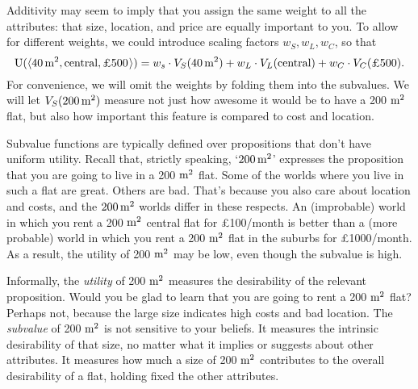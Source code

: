 Additivity may seem to imply that you assign the same weight to all the
attributes: that size, location, and price are equally important to you. To
allow for different weights, we could introduce scaling factors $w_S, w_L, w_C$,
so that
\[
\U(\t{40\, \m^2, \text{central}, \text{£500}}) = w_s \cdot V_{S}(40\, \m^2) +
w_L \cdot V_{L}(\text{central}) + w_C \cdot V_{C}(\text{£500}).
\]
For convenience, we will omit the weights by folding them into the subvalues. We
will let $V_S(200\, \text{m}^2)$ measure not just how awesome it would be to have a 200
$\text{m}^2$ flat, but also how important this feature is compared to cost and
location.

Subvalue functions are typically defined over propositions that don't have
uniform utility. Recall that, strictly speaking, `$200\, \text{m}^{2}$' expresses the
proposition that you are going to live in a 200 $\text{m}^{2}$ flat. Some of the worlds
where you live in such a flat are great. Others are bad. That's because you also
care about location and costs, and the $200\, \text{m}^{2}$ worlds differ in these respects. An
(improbable) world in which you rent a 200 $\text{m}^{2}$ central flat for £100/month
is better than a (more probable) world in which you rent a 200 $\text{m}^{2}$ flat in
the suburbs for £1000/month. As a result, the utility of 200 $\text{m}^2$ may
be low, even though the subvalue is high.

Informally, the \emph{utility} of 200 $\text{m}^{2}$ measures the desirability of the relevant
proposition. Would you be glad to learn that you are going to rent a 200 $\text{m}^{2}$
flat? Perhaps not, because the large size indicates high costs and bad location.
The \emph{subvalue} of 200 $\text{m}^{2}$ is not sensitive to your beliefs. It measures the
intrinsic desirability of that size, no matter what it implies or
suggests about other attributes. It measures how much a size of 200 $\text{m}^{2}$
contributes to the overall desirability of a flat, holding fixed the other
attributes.


